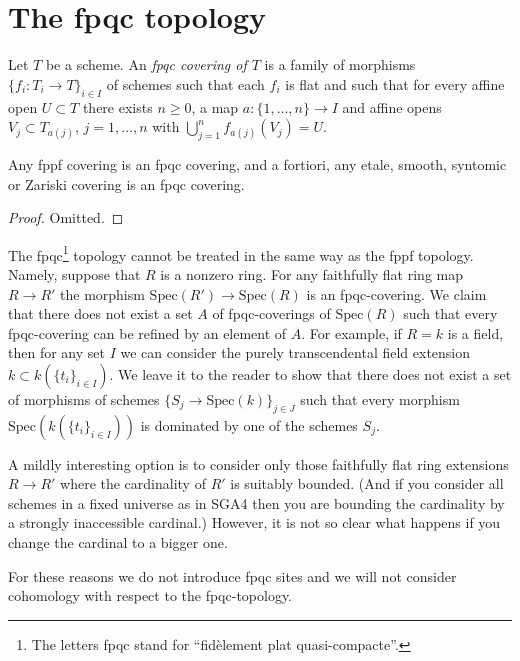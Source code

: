 \section{The fpqc topology}
\label{section-fpqc}

\begin{definition}
\label{definition-fpqc-covering}
Let $T$ be a scheme. An {\it fpqc
covering of $T$} is a family
of morphisms $\{f_i : T_i \to T\}_{i \in I}$ of schemes
such that each $f_i$ is flat and such that for every affine open
$U \subset T$ there exists $n \geq 0$, a map
$a : \{1, \ldots, n\} \to I$ and affine opens
$V_j \subset T_{a(j)}$, $j = 1, \ldots, n$
with $\bigcup_{j = 1}^n f_{a(j)}(V_j) = U$.
\end{definition}

\begin{lemma}
\label{lemma-zariski-etale-fppf-fpqc}
Any fppf covering is an fpqc covering, and a fortiori,
any etale, smooth, syntomic or Zariski covering is an fpqc covering.
\end{lemma}

\begin{proof}
Omitted.
\end{proof}

\noindent
The fpqc\footnote{The letters fpqc stand for
``fid\`element plat quasi-compacte''.}
topology cannot be treated in the same way as the fppf topology.
Namely, suppose that $R$ is a nonzero ring. For any faithfully flat
ring map $R \to R'$ the morphism $\text{Spec}(R') \to \text{Spec}(R)$
is an fpqc-covering. We claim that there does not exist a set $A$ of
fpqc-coverings of $\text{Spec}(R)$ such that every fpqc-covering can
be refined by an element of $A$. For example, if $R = k$ is a field,
then for any set $I$ we can consider the purely transcendental field extension
$k \subset k(\{t_i\}_{i \in I})$. We leave it to the reader to show
that there does not exist a set of morphisms of schemes
$\{S_j \to \text{Spec}(k)\}_{j \in J}$ such that every morphism
$\text{Spec}(k(\{t_i\}_{i \in I}))$ is dominated by one of
the schemes $S_j$.

\medskip\noindent
A mildly interesting option is to consider only those faithfully flat ring
extensions $R \to R'$ where the cardinality of $R'$ is suitably bounded.
(And if you consider all schemes in a fixed universe as in SGA4 then you
are bounding the cardinality by a strongly inaccessible cardinal.)
However, it is not so clear what happens if you change the cardinal
to a bigger one.

\medskip\noindent
For these reasons we do not introduce fpqc sites and we will not consider
cohomology with respect to the fpqc-topology.

